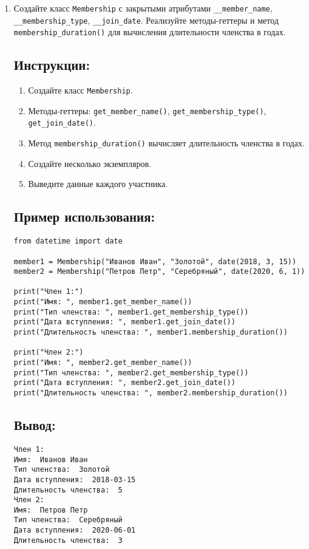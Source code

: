 \begin{enumerate}
\item
Создайте класс \texttt{Membership} с закрытыми атрибутами \texttt{\_\_member\_name}, \texttt{\_\_membership\_type}, \texttt{\_\_join\_date}. Реализуйте методы-геттеры и метод \texttt{membership\_duration()} для вычисления длительности членства в годах.

\subsection*{Инструкции:}
\begin{enumerate}
    \item Создайте класс \texttt{Membership}.
    \item Методы-геттеры: \texttt{get\_member\_name()}, \texttt{get\_membership\_type()}, \texttt{get\_join\_date()}.
    \item Метод \texttt{membership\_duration()} вычисляет длительность членства в годах.
    \item Создайте несколько экземпляров.
    \item Выведите данные каждого участника.
\end{enumerate}

\subsection*{Пример использования:}
\begin{lstlisting}[caption=Пример кода]
from datetime import date

member1 = Membership("Иванов Иван", "Золотой", date(2018, 3, 15))
member2 = Membership("Петров Петр", "Серебряный", date(2020, 6, 1))

print("Член 1:")
print("Имя: ", member1.get_member_name())
print("Тип членства: ", member1.get_membership_type())
print("Дата вступления: ", member1.get_join_date())
print("Длительность членства: ", member1.membership_duration())

print("Член 2:")
print("Имя: ", member2.get_member_name())
print("Тип членства: ", member2.get_membership_type())
print("Дата вступления: ", member2.get_join_date())
print("Длительность членства: ", member2.membership_duration())
\end{lstlisting}

\subsection*{Вывод:}
\begin{lstlisting}[caption=Ожидаемый вывод]
Член 1:
Имя:  Иванов Иван
Тип членства:  Золотой
Дата вступления:  2018-03-15
Длительность членства:  5
Член 2:
Имя:  Петров Петр
Тип членства:  Серебряный
Дата вступления:  2020-06-01
Длительность членства:  3
\end{lstlisting}


\end{enumerate}
